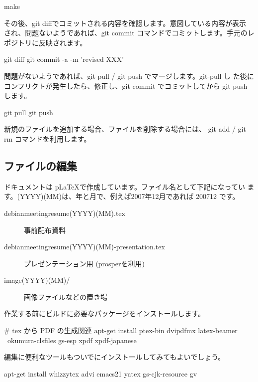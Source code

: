 \documentclass[mingoth,a4paper]{jsarticle}
\begin{document}
\begin{commandline}
 make
\end{commandline}

その後、git diffでコミットされる内容を確認します。意図している内容が表示
され、問題ないようであれば、git commit コマンドでコミットします。手元のレ
ポジトリに反映されます。

\begin{commandline}
 git diff
 git commit -a -m 'revised XXX'
\end{commandline}

問題がないようであれば、git pull / git push でマージします。git-pull し
た後にコンフリクトが発生したら、修正し、git commit でコミットしてから
git push します。

\begin{commandline}
 git pull 
 git push 
\end{commandline}

新規のファイルを追加する場合、ファイルを削除する場合には、 git add /
git rm コマンドを利用します。

\subsection{ファイルの編集}

ドキュメントは p\LaTeX{}で作成しています。ファイル名として下記になってい
ます。(YYYY)(MM)は、年と月で、例えば2007年12月であれば 200712 です。

\begin{description}
 \item[debianmeetingresume(YYYY)(MM).tex]
	    事前配布資料
 \item[debianmeetingresume(YYYY)(MM)-presentation.tex]
	    プレゼンテーション用 (prosperを利用)
 \item[image(YYYY)(MM)/]
	    画像ファイルなどの置き場
\end{description}


作業する前にビルドに必要なパッケージをインストールします。

\begin{commandline}
# tex から PDF の生成関連
apt-get install ptex-bin dvipdfmx latex-beamer \
 okumura-clsfiles gs-esp xpdf xpdf-japanese
\end{commandline}

編集に便利なツールもついでにインストールしてみてもよいでしょう。

\begin{commandline}
 apt-get install whizzytex advi emacs21 yatex gs-cjk-resource gv
\end{commandline}
\end{document}
